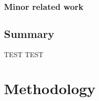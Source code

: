 \documentclass[a4paper,10pt,twocolumn]{article}
\numberwithin{figure}{section}
\numberwithin{table}{section}
\begin{document}
\subsubsection{Minor related work}

\subsection{Summary}

\newpage
TEST
\newpage
TEST
\newpage



















\section{Methodology}


\end{document}
